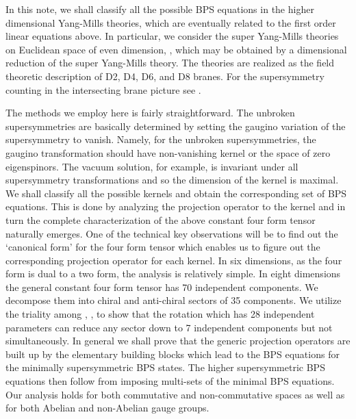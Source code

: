 \documentclass[a4paper,11pt]{article}
\begin{document}
In this note, we shall classify  all the possible BPS equations in the higher dimensional Yang-Mills theories, which are eventually related to the
first order linear equations  above. In particular, we consider the super Yang-Mills theories on Euclidean space of even   dimension, \coordHE{}, which may
be obtained by a dimensional reduction of the \coordHE{}  \coordHE{} super  Yang-Mills theory. The \coordHE{}  theories are  realized as the field
theoretic description of  D2, D4, D6, and D8 branes. For the supersymmetry counting in the intersecting brane picture see
\cite{OhtaTownsend,Chen:1999bf}.


The methods we employ here is  fairly straightforward. The unbroken supersymmetries are basically determined by setting the gaugino variation of the
supersymmetry to vanish. Namely, for the unbroken supersymmetries, the gaugino transformation  should have non-vanishing kernel or the space of zero
eigenspinors. The vacuum solution, for example, is invariant under all supersymmetry transformations and so the dimension of the kernel is maximal.
We shall classify all the possible kernels  and  obtain the corresponding set of  BPS equations. This is done by  analyzing the projection operator
to the kernel and in turn the complete characterization of the above constant four form tensor naturally emerges.  One of the technical key
observations will be  to find out  the `canonical form' for the four form tensor which  enables us to figure out the corresponding projection
operator for each kernel. In six dimensions, as the four form is dual to a two form, the analysis is relatively  simple.  In eight dimensions the
general constant four form tensor has 70 independent components. We decompose them into chiral and anti-chiral sectors of   35 components. We
utilize the \coordHE{} triality among \coordHE{}, \coordHE{}, \coordHE{} to show that the \coordHE{} rotation which has 28
independent parameters can reduce any  sector down to 7 independent components but not simultaneously.   In general we shall prove that the generic
projection operators are built up  by the elementary building blocks which lead to the BPS equations for the minimally supersymmetric BPS states.
The higher supersymmetric BPS equations  then follow from imposing   multi-sets of the minimal  BPS equations. Our analysis holds for both
commutative and non-commutative spaces as well as for both Abelian and non-Abelian gauge groups.
\end{document}
